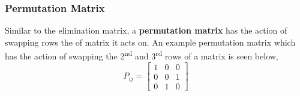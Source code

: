         \subsubsection{Permutation Matrix}
            Similar to the elimination matrix, a \textbf{permutation matrix} has the action of swapping rows the of 
            matrix it acts on. An example permutation matrix which has the action of swapping the 2\textsuperscript{nd}
            and 3\textsuperscript{rd} rows of a matrix is seen below,
            \begin{equation}
                P_{ij} = 
                \begin{bmatrix}
                    1 & 0 & 0 \\
                    0 & 0 & 1 \\
                    0 & 1 & 0 
                \end{bmatrix}
            \end{equation}
        
